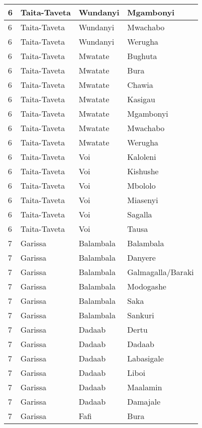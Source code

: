 \begin{table}[!ht]
\begin{tabular}{|l|l|l|l|}
        6 & Taita-Taveta & Wundanyi & Mgambonyi \\ \hline
        6 & Taita-Taveta & Wundanyi & Mwachabo \\ \hline
        6 & Taita-Taveta & Wundanyi & Werugha \\ \hline
        6 & Taita-Taveta & Mwatate & Bughuta \\ \hline
        6 & Taita-Taveta & Mwatate & Bura \\ \hline
        6 & Taita-Taveta & Mwatate & Chawia \\ \hline
        6 & Taita-Taveta & Mwatate & Kasigau \\ \hline
        6 & Taita-Taveta & Mwatate & Mgambonyi \\ \hline
        6 & Taita-Taveta & Mwatate & Mwachabo \\ \hline
        6 & Taita-Taveta & Mwatate & Werugha \\ \hline
        6 & Taita-Taveta & Voi & Kaloleni \\ \hline
        6 & Taita-Taveta & Voi & Kishushe \\ \hline
        6 & Taita-Taveta & Voi & Mbololo \\ \hline
        6 & Taita-Taveta & Voi & Miasenyi \\ \hline
        6 & Taita-Taveta & Voi & Sagalla \\ \hline
        6 & Taita-Taveta & Voi & Tausa \\ \hline
        7 & Garissa & Balambala & Balambala \\ \hline
        7 & Garissa & Balambala & Danyere \\ \hline
        7 & Garissa & Balambala & Galmagalla/Baraki \\ \hline
        7 & Garissa & Balambala & Modogashe \\ \hline
        7 & Garissa & Balambala & Saka \\ \hline
        7 & Garissa & Balambala & Sankuri \\ \hline
        7 & Garissa & Dadaab & Dertu \\ \hline
        7 & Garissa & Dadaab & Dadaab \\ \hline
        7 & Garissa & Dadaab & Labasigale \\ \hline
        7 & Garissa & Dadaab & Liboi \\ \hline
        7 & Garissa & Dadaab & Maalamin \\ \hline
        7 & Garissa & Dadaab & Damajale \\ \hline
        7 & Garissa & Fafi & Bura \\ \hline

\end{tabular}
\end{table}
